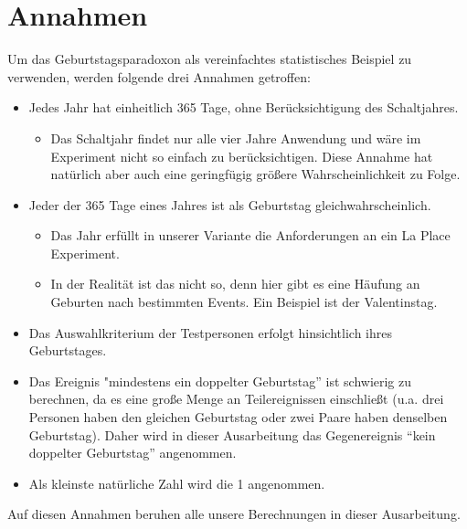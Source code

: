 \documentclass[11pt]{article}
\begin{document}
    \section{Annahmen}

    Um das Geburtstagsparadoxon als vereinfachtes statistisches Beispiel zu verwenden, werden folgende drei Annahmen getroffen:

    \begin{itemize}
        \item Jedes Jahr hat einheitlich 365 Tage, ohne Berücksichtigung des Schaltjahres.
        \begin{itemize}
            \item Das Schaltjahr findet nur alle vier Jahre Anwendung und wäre im Experiment nicht so einfach zu berücksichtigen. Diese Annahme hat natürlich aber auch eine geringfügig größere Wahrscheinlichkeit zu Folge.
        \end{itemize}
    \end{itemize}

    \begin{itemize}
        \item Jeder der 365 Tage eines Jahres ist als Geburtstag gleichwahrscheinlich.

        \begin{itemize}
            \item Das Jahr erfüllt in unserer Variante die Anforderungen an ein La Place Experiment.
        \end{itemize}

        \begin{itemize}
            \item In der Realität ist das nicht so, denn hier gibt es eine Häufung an Geburten nach bestimmten Events. Ein Beispiel ist der Valentinstag.
        \end{itemize}

    \end{itemize}

    \begin{itemize}
        \item Das Auswahlkriterium der Testpersonen erfolgt hinsichtlich ihres Geburtstages.
    \end{itemize}

    \begin{itemize}
        \item Das Ereignis "mindestens ein doppelter Geburtstag” ist schwierig zu berechnen, da es eine große Menge an Teilereignissen einschließt (u.a. drei Personen haben den gleichen Geburtstag oder zwei Paare haben denselben Geburtstag). Daher wird in dieser Ausarbeitung das Gegenereignis “kein doppelter Geburtstag” angenommen.
    \end{itemize}

    \begin{itemize}
        \item Als kleinste natürliche Zahl wird die 1 angenommen.
    \end{itemize}

Auf diesen Annahmen beruhen alle unsere Berechnungen in dieser Ausarbeitung.
\end{document}
